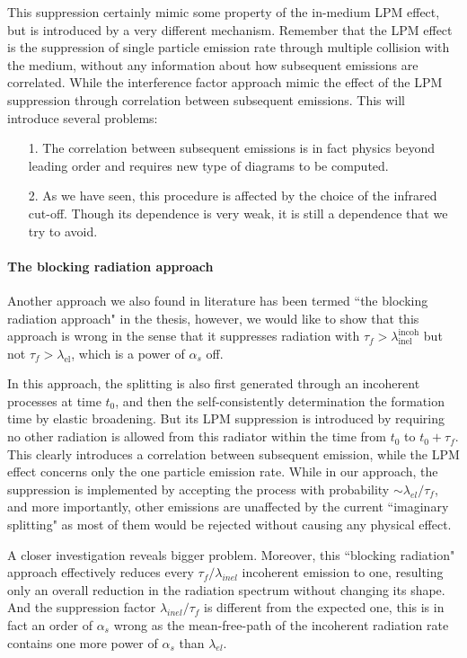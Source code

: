 This suppression certainly mimic some property of the in-medium LPM effect, but is introduced by a very different mechanism.
Remember that the LPM effect is the suppression of single particle emission rate through multiple collision with the medium, without any information about how subsequent emissions are correlated. 
While the interference factor approach mimic the effect of the LPM suppression through correlation between subsequent emissions.
This will introduce several problems: 
\begin{itemize}
\item[1.] The correlation between subsequent emissions is in fact physics beyond leading order and requires new type of diagrams to be computed.
\item[2.] As we have seen, this procedure is affected by the choice of the infrared cut-off. Though its dependence is very weak, it is still a dependence that we try to avoid.
\end{itemize}

\paragraph*{The blocking radiation approach}
Another approach we also found in literature has been termed ``the blocking radiation approach" in the thesis, however, we would like to show that this approach is wrong in the sense that it suppresses radiation with $\tau_f > \lambda_{\textrm{inel}}^{\textrm{incoh}}$ but not $\tau_f > \lambda_{\textrm{el}}$, which is a power of $\alpha_s$ off.

In this approach, the splitting is also first generated through an incoherent processes at time $t_0$, and then the self-consistently determination the formation time by elastic broadening. 
But its LPM suppression is introduced by requiring no other radiation is allowed from this radiator within the time from $t_0$ to $t_0 + \tau_f$.
This clearly introduces a correlation between subsequent emission, while the LPM effect concerns only the one particle emission rate.
While in our approach, the suppression is implemented by accepting the process with probability $\sim \lambda_{el}/\tau_f$, and more importantly, other emissions are unaffected by the current ``imaginary splitting" as most of them would be rejected without causing any physical effect.

A closer investigation reveals bigger problem.
Moreover, this ``blocking radiation" approach effectively reduces every $\tau_f/\lambda_{inel}$ incoherent emission to one, resulting only an overall reduction in the radiation spectrum without changing its shape.
And the suppression factor $\lambda_{inel}/\tau_f$ is different from the expected one, this is in fact an order of $\alpha_s$ wrong as the mean-free-path of the incoherent radiation rate contains one more power of $\alpha_s$ than $\lambda_{el}$.